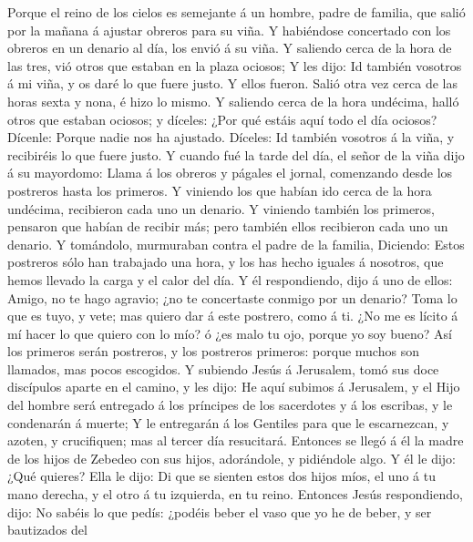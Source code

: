 Porque el reino de los cielos es semejante á un hombre,
padre de familia, que salió por la mañana á ajustar obreros para su
viña.  Y habiéndose concertado con los obreros en un denario
al día, los envió á su viña.  Y saliendo cerca de la hora de
las tres, vió otros que estaban en la plaza ociosos;  Y les
dijo: Id también vosotros á mi viña, y os daré lo que fuere justo. Y
ellos fueron.  Salió otra vez cerca de las horas sexta y
nona, é hizo lo mismo.  Y saliendo cerca de la hora
undécima, halló otros que estaban ociosos; y díceles: ¿Por qué estáis
aquí todo el día ociosos?  Dícenle: Porque nadie nos ha
ajustado. Díceles: Id también vosotros á la viña, y recibiréis lo que
fuere justo.  Y cuando fué la tarde del día, el señor de la
viña dijo á su mayordomo: Llama á los obreros y págales el jornal,
comenzando desde los postreros hasta los primeros.  Y
viniendo los que habían ido cerca de la hora undécima, recibieron cada
uno un denario.  Y viniendo también los primeros, pensaron
que habían de recibir más; pero también ellos recibieron cada uno un
denario.  Y tomándolo, murmuraban contra el padre de la
familia,  Diciendo: Estos postreros sólo han trabajado una
hora, y los has hecho iguales á nosotros, que hemos llevado la carga y
el calor del día.  Y él respondiendo, dijo á uno de ellos:
Amigo, no te hago agravio; ¿no te concertaste conmigo por un denario?
 Toma lo que es tuyo, y vete; mas quiero dar á este
postrero, como á ti.  ¿No me es lícito á mí hacer lo que
quiero con lo mío? ó ¿es malo tu ojo, porque yo soy bueno? 
Así los primeros serán postreros, y los postreros primeros: porque
muchos son llamados, mas pocos escogidos.  Y subiendo Jesús
á Jerusalem, tomó sus doce discípulos aparte en el camino, y les dijo:
 He aquí subimos á Jerusalem, y el Hijo del hombre será
entregado á los príncipes de los sacerdotes y á los escribas, y le
condenarán á muerte;  Y le entregarán á los Gentiles para
que le escarnezcan, y azoten, y crucifiquen; mas al tercer día
resucitará.  Entonces se llegó á él la madre de los hijos
de Zebedeo con sus hijos, adorándole, y pidiéndole algo.  Y
él le dijo: ¿Qué quieres? Ella le dijo: Di que se sienten estos dos
hijos míos, el uno á tu mano derecha, y el otro á tu izquierda, en tu
reino.  Entonces Jesús respondiendo, dijo: No sabéis lo que
pedís: ¿podéis beber el vaso que yo he de beber, y ser bautizados del
